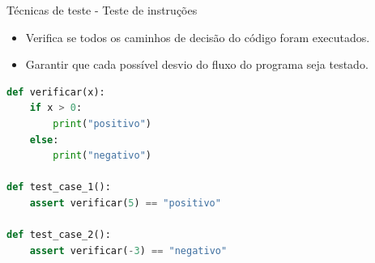 
\begin{frame}[fragile]{Técnicas de teste - Teste de instruções}
    \begin{itemize}
        \item Verifica se todos os caminhos de decisão do código foram executados.
        \item Garantir que cada possível desvio do fluxo do programa seja testado.
    \end{itemize}

\begin{lstlisting}[language=Python]
def verificar(x):
    if x > 0:
        print("positivo")
    else:
        print("negativo")

def test_case_1():
    assert verificar(5) == "positivo"

def test_case_2():
    assert verificar(-3) == "negativo"

\end{lstlisting}

\end{frame}